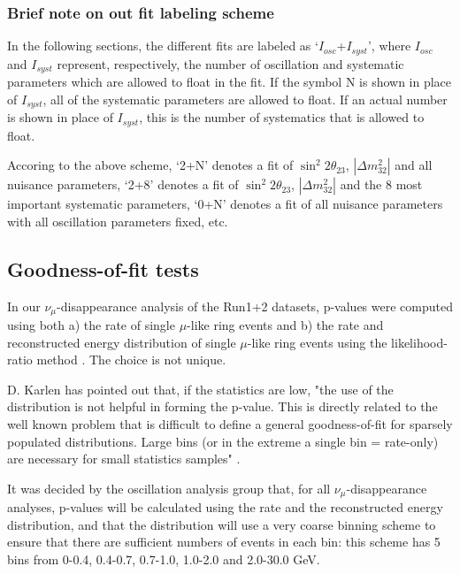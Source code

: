 \subsubsection {Brief note on out fit labeling scheme}
\label{sec:oscfit_method_label}

In the following sections, the different fits are labeled as `$I_{osc}$+$I_{syst}$', 
where $I_{osc}$ and $I_{syst}$ represent, respectively, the number of oscillation and systematic
parameters which are allowed to float in the fit.
If the symbol N is shown in place of $I_{syst}$, all of the systematic parameters are allowed to float.
If an actual number is shown in place of $I_{syst}$, this is the number of systematics that is allowed to float.

Accoring to the above scheme, 
`2+N' denotes a fit of $\sin^{2}2\theta_{23}$, $|\Delta m^{2}_{32}|$ and all nuisance parameters, 
`2+8' denotes a fit of $\sin^{2}2\theta_{23}$, $|\Delta m^{2}_{32}|$ and the 8 most important systematic parameters,
`0+N' denotes a fit of all nuisance parameters with all oscillation parameters fixed, etc.

\subsection {Goodness-of-fit tests}
\label{sec:gof_test}

In our $\nu_{\mu}$-disappearance analysis of the Run1+2 datasets, p-values were computed using both 
a) the rate of single $\mu$-like ring events and 
b) the rate and reconstructed energy distribution of single $\mu$-like ring events using the likelihood-ratio method \cite{NickPvalue}.
The choice is not unique.

D. Karlen has pointed out that, if the statistics are low, "the use of the
distribution is not helpful in forming the p-value. 
This is directly related to the well known problem that is difficult to define
a general goodness-of-fit for sparsely populated distributions.
Large bins (or in the extreme a single bin = rate-only)
are necessary for small statistics samples" \cite{KarlenPvalue}.

It was decided by the oscillation analysis group that, for all $\nu_{\mu}$-disappearance analyses, 
p-values will be calculated using the rate and the reconstructed energy distribution,
and that the distribution will use a very coarse binning
scheme to ensure that there are sufficient numbers of events in each bin: 
this scheme has 5 bins from 0-0.4, 0.4-0.7, 0.7-1.0, 1.0-2.0 and 2.0-30.0 GeV.

